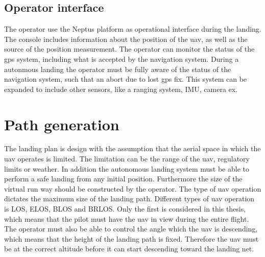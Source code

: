 \subsection{Operator interface}
The operator use the Neptus platform as operational interface during the landing. The console includes information about the position of the uav, as well as the source of the position measurement. The operator can monitor the status of the gps system, including what is accepted by the navigation system. During a autonmous landing the operator must be fully aware of the status of the navigation system, such that an abort due to lost gps fix. This system can be expanded to include other sensors, like a ranging system, IMU, camera ex.
\section{Path generation}
The landing plan is design with the assumption that the aerial space in which the uav operates is limited. The limitation can be the range of the uav, regulatory limits or weather. In addition the autonomous landing system must be able to perform a safe landing from any initial position. Furthermore the size of the virtual run way should be constructed by the operator. The type of uav operation dictates the maximum size of the landing path. Different types of uav operation is LOS, ELOS, BLOS and BRLOS. Only the first is considered in this thesis, which means that the pilot must have the uav in view during the entire flight. The operator must also be able to control the angle which the uav is descending, which means that the height of the landing path is fixed. Therefore the uav must be at the correct altitude before it can start descending toward the landing net.

